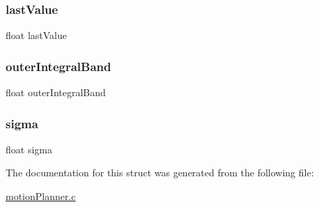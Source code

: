 \subsubsection{\texorpdfstring{last\+Value}{lastValue}}
{\footnotesize\ttfamily float last\+Value}

\mbox{\label{struct_p_i_d_a02d0ee6d23eee5716d8e390aa387f237}} 
\subsubsection{\texorpdfstring{outer\+Integral\+Band}{outerIntegralBand}}
{\footnotesize\ttfamily float outer\+Integral\+Band}

\mbox{\label{struct_p_i_d_ae11aeeb83e22b5b7f1e6b4347eb1daa6}} 
\subsubsection{\texorpdfstring{sigma}{sigma}}
{\footnotesize\ttfamily float sigma}



The documentation for this struct was generated from the following file\+:\begin{DoxyCompactItemize}
\item 
\hyperlink{motion_planner_8c}{motion\+Planner.\+c}\end{DoxyCompactItemize}
